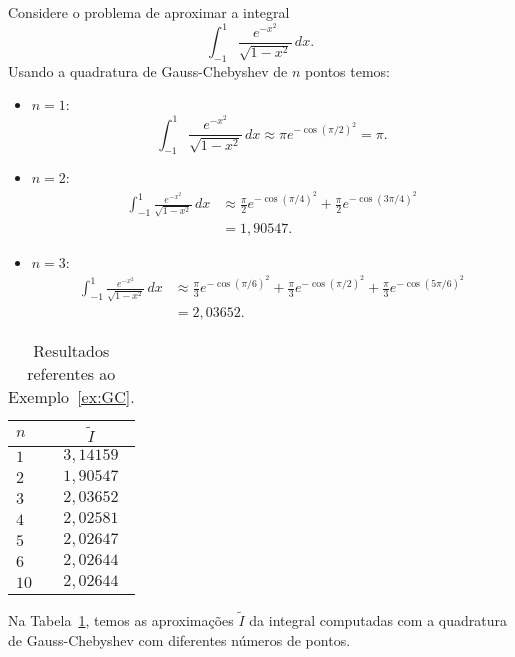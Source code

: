 \begin{ex}\label{ex:GC}
  Considere o problema de aproximar a integral
  \begin{equation}
    \int_{-1}^1 \frac{e^{-x^2}}{\sqrt{1-x^2}}\,dx.
  \end{equation}
Usando a quadratura de Gauss-Chebyshev de $n$ pontos temos:
\begin{itemize}
\item $n=1$:
  \begin{equation}
  \int_{-1}^1 \frac{e^{-x^2}}{\sqrt{1-x^2}}\,dx \approx \pi e^{-\cos(\pi/2)^2} = \pi.
\end{equation}
\item $n=2$:
  \begin{align}
  \int_{-1}^1 \frac{e^{-x^2}}{\sqrt{1-x^2}}\,dx &\approx \frac{\pi}{2} e^{-\cos(\pi/4)^2} + \frac{\pi}{2} e^{-\cos(3\pi/4)^2}  \\
    &= 1,90547.
\end{align}
\item $n=3$:
  \begin{align}
  \int_{-1}^1 \frac{e^{-x^2}}{\sqrt{1-x^2}}\,dx &\approx \frac{\pi}{3} e^{-\cos(\pi/6)^2} + \frac{\pi}{3} e^{-\cos(\pi/2)^2} + \frac{\pi}{3} e^{-\cos(5\pi/6)^2}  \\
    &= 2,03652.
\end{align}
\end{itemize}

\begin{table}[h!]
  \centering
  \begin{tabular}{lc}
    $n$ & $\tilde{I}$\\\hline
    $1$ & $3,14159$\\
    $2$ & $1,90547$\\
    $3$ & $2,03652$\\
    $4$ & $2,02581$\\
    $5$ & $2,02647$\\
    $6$ & $2,02644$\\
    $10$ & $2,02644$\\\hline
  \end{tabular}
  \caption{Resultados referentes ao Exemplo~\ref{ex:GC}.}
  \label{tab:ex_GC}
\end{table}

Na Tabela~\ref{tab:ex_GC}, temos as aproximações $\tilde{I}$ da integral computadas com a quadratura de Gauss-Chebyshev  com diferentes números de pontos.
\end{ex}

